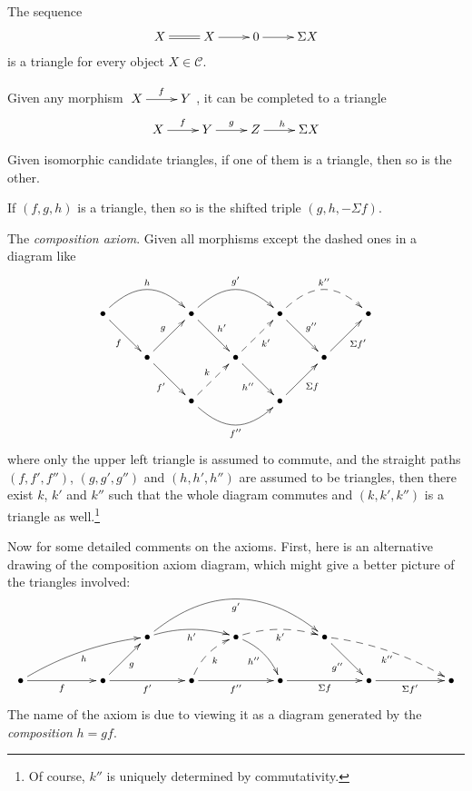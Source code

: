 \documentclass{amsproc}
\theoremstyle{definition}
\begin{document}
\begin{compactenum}
\item\label{T1} The sequence
\begin{displaymath}
\xymatrix{X\ar@{=}[r] & X \ar[r] & 0 \ar[r] & {}\Sigma X}
\end{displaymath}
is a triangle for every object $X\in{\mathcal{C}}$.
\item\label{T2} Given any morphism $\xymatrix{X\ar[r]^f & Y}$, it can be completed to a triangle
\begin{displaymath}
\xymatrix{X\ar[r]^f & Y\ar[r]^g & Z\ar[r]^h & {}\Sigma X}
\end{displaymath}
\item\label{T3} Given isomorphic candidate triangles, if one of them is a triangle, then so is the other.

\item\label{T4} If $(f,g,h)$ is a triangle, then so is the shifted triple $(g,h,-\Sigma f)$.
\item\label{T5} The \emph{composition axiom}. Given all morphisms except the dashed ones in a diagram like
\begin{displaymath}
\xymatrix{{\bullet}\ar@(ru,lu)[rr]^h\ar[rd]_f & & {\bullet}\ar@(ru,lu)[rr]^{g'}\ar[rd]^{h'} & & {\bullet}\ar@(ru,lu)@{-->}[rr]^{k''}\ar[rd]^{g''} & & {\bullet}\\
& {\bullet}\ar[ur]^g\ar[rd]_{f'} & & {\bullet}\ar@{-->}[ru]_{k'}\ar[rd]_{h''} & & {\bullet}\ar[ru]_{\Sigma f'} &\\
& & {\bullet}\ar@(rd,ld)[rr]_{f''}\ar@{-->}[ru]^{k} & & {\bullet}\ar[ru]_{\Sigma f} & &}
\end{displaymath}
where only the upper left triangle is assumed to commute, and the straight paths $(f,f',f'')$, $(g,g',g'')$ and $(h,h',h'')$ are assumed to be triangles, then there exist $k$, $k'$ and $k''$ such that the whole diagram commutes and $(k,k',k'')$ is a triangle as well.\footnote{Of course, $k''$ is uniquely determined by commutativity.}
\end{compactenum}\phantom{lineends\\}

\noindent Now for some detailed comments on the axioms. First, here is an alternative drawing of the composition axiom diagram, which might give a better picture of the triangles involved:
\begin{displaymath}
\xymatrix{&&&{\bullet}\ar@/^.5pc/[rr]_{h'}\ar@/^2.5pc/[rrrr]_{g'}&&{\bullet}\ar@/^.5pc/@{-->}[rr]_{k'}\ar@/^.5pc/[rd]_{h''}&&{\bullet}\ar@/^.5pc/@{-->}[rrrd]_{k''}\ar[rd]_{g''}&&&\\
{\bullet}\ar[rr]_f\ar@/^.5pc/[rrru]_h&&{\bullet}\ar[rr]_{f'}\ar[ru]_g&&{\bullet}\ar[rr]_{f''}\ar@/^.5pc/@{-->}[ru]_k&&{\bullet}\ar[rr]_{\Sigma f}&&{\bullet}\ar[rr]_{\Sigma f'}&&{\bullet}}
\end{displaymath}
The name of the axiom is due to viewing it as a diagram generated by the \emph{composition} $h=gf$.
\end{document}
